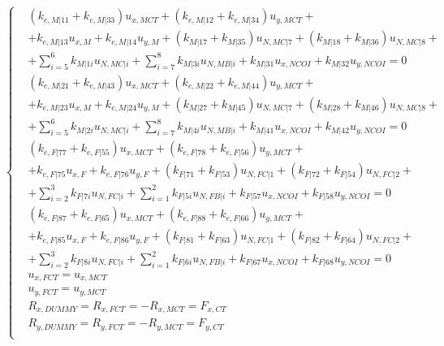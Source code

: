 \documentclass[a4paper]{jpconf}
\begin{document}
\begin{equation}
\begin{cases}
&\left(k_{e,M|11}+k_{e,M|33}\right)u_{x,MCT}+\left(k_{e,M|12}+k_{e,M|34}\right)u_{y,MCT}+\\&+k_{e,M|13}u_{x,M}+k_{e,M|14}u_{y,M}+\left(k_{M|17}+k_{M|35}\right)u_{N,MC|7}+\left(k_{M|18}+k_{M|36}\right)u_{N,MC|8}+\\&+\sum_{i=5}^{6}k_{M|1i}u_{N,MC|i}+\sum_{i=7}^{8}k_{M|3i}u_{N,MB|i}+k_{M|31}u_{x,NCOI}+k_{M|32}u_{y,NCOI}=0\\[10pt]
&\left(k_{e,M|21}+k_{e,M|43}\right)u_{x,MCT}+\left(k_{e,M|22}+k_{e,M|44}\right)u_{y,MCT}+\\&+k_{e,M|23}u_{x,M}+k_{e,M|24}u_{y,M}+\left(k_{M|27}+k_{M|45}\right)u_{N,MC|7}+\left(k_{M|28}+k_{M|46}\right)u_{N,MC|8}+\\&+\sum_{i=5}^{6}k_{M|2i}u_{N,MC|i}+\sum_{i=7}^{8}k_{M|4i}u_{N,MB|i}+k_{M|41}u_{x,NCOI}+k_{M|42}u_{y,NCOI}=0\\[10pt]
&\left(k_{e,F|77}+k_{e,F|55}\right)u_{x,MCT}+\left(k_{e,F|78}+k_{e,F|56}\right)u_{y,MCT}+\\&+k_{e,F|75}u_{x,F}+k_{e,F|76}u_{y,F}+\left(k_{F|71}+k_{F|53}\right)u_{N,FC|1}+\left(k_{F|72}+k_{F|54}\right)u_{N,FC|2}+\\&+\sum_{i=2}^{3}k_{F|7i}u_{N,FC|i}+\sum_{i=1}^{2}k_{F|5i}u_{N,FB|i}+k_{F|57}u_{x,NCOI}+k_{F|58}u_{y,NCOI}=0\\[10pt]
&\left(k_{e,F|87}+k_{e,F|65}\right)u_{x,MCT}+\left(k_{e,F|88}+k_{e,F|66}\right)u_{y,MCT}+\\&+k_{e,F|85}u_{x,F}+k_{e,F|86}u_{y,F}+\left(k_{F|81}+k_{F|63}\right)u_{N,FC|1}+\left(k_{F|82}+k_{F|64}\right)u_{N,FC|2}+\\&+\sum_{i=2}^{3}k_{F|8i}u_{N,FC|i}+\sum_{i=1}^{2}k_{F|6i}u_{N,FB|i}+k_{F|67}u_{x,NCOI}+k_{F|68}u_{y,NCOI}=0\\[10pt]
&u_{x,FCT}=u_{x,MCT}\\
&u_{y,FCT}=u_{y,MCT}\\[10pt]
&R_{x,DUMMY}=R_{x,FCT}=-R_{x,MCT}=F_{x,CT}\\
&R_{y,DUMMY}=R_{y,FCT}=-R_{y,MCT}=F_{y,CT}\\
\end{cases}
\end{equation}
\end{document}
